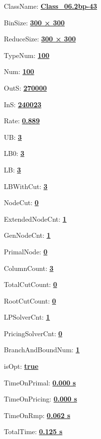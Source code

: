 \documentclass[11pt]{article}
\begin{document}
\pagestyle{empty}


ClassName: \underline{\textbf{Class_06.2bp-43}}
\par
BinSize: \underline{\textbf{300 × 300}}
\par
ReduceSize: \underline{\textbf{300 × 300}}
\par
TypeNum: \underline{\textbf{100}}
\par
Num: \underline{\textbf{100}}
\par
OutS: \underline{\textbf{270000}}
\par
InS: \underline{\textbf{240023}}
\par
Rate: \underline{\textbf{0.889}}
\par
UB: \underline{\textbf{3}}
\par
LB0: \underline{\textbf{3}}
\par
LB: \underline{\textbf{3}}
\par
LBWithCut: \underline{\textbf{3}}
\par
NodeCut: \underline{\textbf{0}}
\par
ExtendedNodeCnt: \underline{\textbf{1}}
\par
GenNodeCnt: \underline{\textbf{1}}
\par
PrimalNode: \underline{\textbf{0}}
\par
ColumnCount: \underline{\textbf{3}}
\par
TotalCutCount: \underline{\textbf{0}}
\par
RootCutCount: \underline{\textbf{0}}
\par
LPSolverCnt: \underline{\textbf{1}}
\par
PricingSolverCnt: \underline{\textbf{0}}
\par
BranchAndBoundNum: \underline{\textbf{1}}
\par
isOpt: \underline{\textbf{true}}
\par
TimeOnPrimal: \underline{\textbf{0.000 s}}
\par
TimeOnPricing: \underline{\textbf{0.000 s}}
\par
TimeOnRmp: \underline{\textbf{0.062 s}}
\par
TotalTime: \underline{\textbf{0.125 s}}
\par
\newpage
\end{document}

